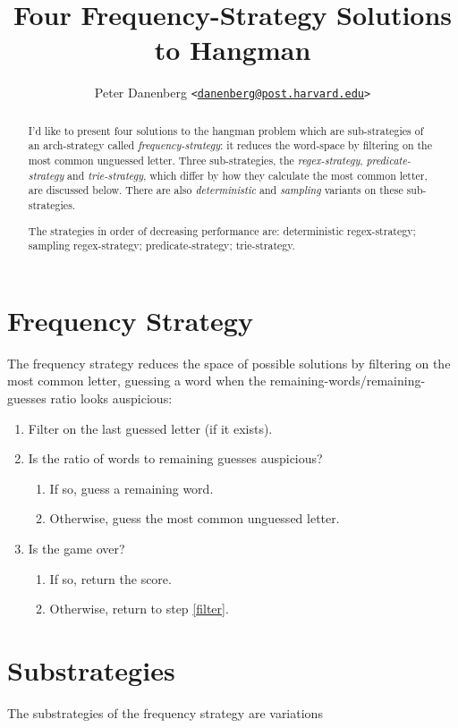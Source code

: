 \documentclass{article}
\title{Four Frequency-Strategy Solutions to Hangman}
\author{Peter Danenberg
  \texttt{<}\href{mailto:danenberg@post.harvard.edu}
  {\nolinkurl{danenberg@post.harvard.edu}}\texttt{>}}
\begin{document}
\maketitle
\begin{abstract}
I'd like to present four solutions to the hangman problem which are
sub-strategies of an arch-strategy called \emph{frequency-strategy}:
it reduces the word-space by filtering on the most common unguessed
letter. Three sub-strategies, the \emph{regex-strategy},
\emph{predicate-strategy} and \emph{trie-strategy}, which differ by
how they calculate the most common letter, are discussed below. There
are also \emph{deterministic} and \emph{sampling} variants on
these sub-strategies.

The strategies in order of decreasing performance are: deterministic
regex-strategy; sampling regex-strategy; predicate-strategy;
trie-strategy.
\end{abstract}
\tableofcontents
\section{Frequency Strategy}
The frequency strategy reduces the space of possible solutions by
filtering on the most common letter, guessing a word when the
remaining-words/remaining-guesses ratio looks auspicious:

\begin{enumerate}
\item \label{filter} Filter on the last guessed letter (if it exists).
\item Is the ratio of words to remaining guesses auspicious?
  \begin{enumerate}
  \item If so, guess a remaining word.
  \item \label{common-letter} Otherwise, guess the most common unguessed letter.
  \end{enumerate}
\item Is the game over?
  \begin{enumerate}
  \item If so, return the score.
  \item Otherwise, return to step \ref{filter}.
  \end{enumerate}
\end{enumerate}

\section{Substrategies}
The substrategies of the frequency strategy are variations
\end{document}
